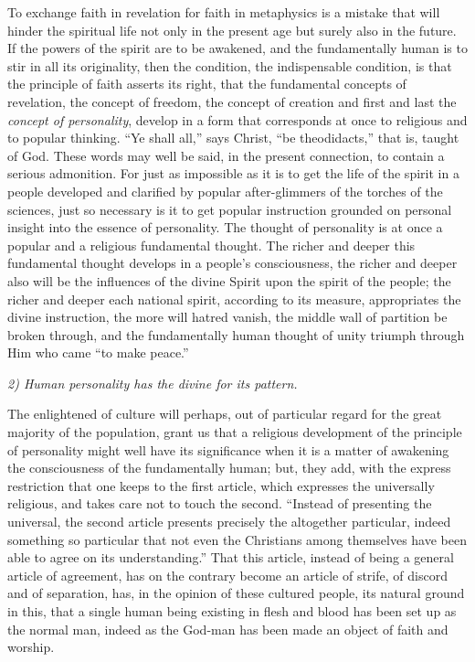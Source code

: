 \documentclass[12pt]{book}
\newcommand{\opage}[1]{\marginnote{\footnotesize\textit{[#1]}}}
\begin{document}
To exchange faith in revelation for faith in metaphysics is a mistake
that will hinder the spiritual life not only in the present age but
surely also in the future. If the powers of the spirit are to be
awakened, and the fundamentally human is to stir in all its originality,
then the condition, the indispensable condition, is that the principle
of faith asserts its right, that the fundamental concepts of revelation,
the concept of freedom, the concept of creation and first and last the
\textit{concept of personality}, develop in a form
\opage{146}\setcounter{footnote}{0}%
that corresponds at once to religious and to popular thinking. ``Ye
shall all,'' says Christ, ``be theodidacts,'' that is, taught of God.
These words may well be said, in the present connection, to contain a
serious admonition. For just as impossible as it is to get the life of
the spirit in a people developed and clarified by popular after-glimmers
of the torches of the sciences, just so necessary is it to get popular
instruction grounded on personal insight into the essence of
personality. The thought of personality is at once a popular and a
religious fundamental thought. The richer and deeper this fundamental
thought develops in a people's consciousness, the richer and deeper also
will be the influences of the divine Spirit upon the spirit of the
people; the richer and deeper each national spirit, according to its
measure, appropriates the divine instruction, the more will hatred
vanish, the middle wall of partition be broken through, and the
fundamentally human thought of unity triumph through Him who came ``to
make peace.''

\textit{2) Human personality has the divine for its pattern.}

The enlightened of culture will perhaps, out of particular regard for
the great majority of the population, grant us that a religious
development of the principle of personality might well have its
significance when it is a matter of awakening the consciousness of the
fundamentally human; but, they add, with the express restriction that
one keeps to the first article, which expresses the universally
religious, and takes care not to touch the second. ``Instead of
presenting the universal, the second article presents precisely the
altogether particular, indeed something so particular that not even the
Christians among themselves have been able to agree on its
understanding.'' That this article, instead of being a general article
of agreement, has on the contrary become an article of strife, of
discord and of separation, has, in the opinion of these
\opage{147}\setcounter{footnote}{0}%
cultured people, its natural ground in this, that a single human being
existing in flesh and blood has been set up as the normal man, indeed
as the God-man has been made an object of faith and worship.
\end{document}
